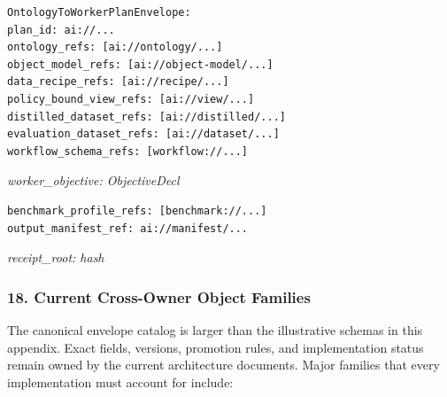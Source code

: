 \documentclass[
  11pt,
]{article}
\begin{document}
\begin{lstlisting}[language={},basicstyle=\ttfamily\scriptsize]
OntologyToWorkerPlanEnvelope:
plan_id: ai://...
ontology_refs: [ai://ontology/...]
object_model_refs: [ai://object-model/...]
data_recipe_refs: [ai://recipe/...]
policy_bound_view_refs: [ai://view/...]
distilled_dataset_refs: [ai://distilled/...]
evaluation_dataset_refs: [ai://dataset/...]
workflow_schema_refs: [workflow://...]
\end{lstlisting}
\emph{worker\_objective: ObjectiveDecl}

\begin{lstlisting}[language=rustioi]
benchmark_profile_refs: [benchmark://...]
output_manifest_ref: ai://manifest/...
\end{lstlisting}
\emph{receipt\_root: hash}

\hypertarget{current-cross-owner-object-families}{%
\subsubsection{18. Current Cross-Owner Object
Families}\label{current-cross-owner-object-families}}

The canonical envelope catalog is larger than the illustrative schemas in
this appendix. Exact fields, versions, promotion rules, and implementation
status remain owned by the current architecture documents. Major families
that every implementation must account for include:
\end{document}
